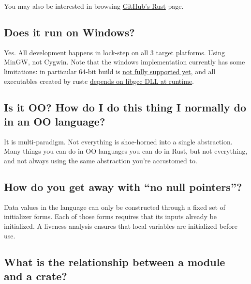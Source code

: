 \documentclass[]{article}
\begin{document}
You may also be interested in browsing
\href{https://github.com/trending?l=rust}{GitHub's Rust} page.

\subsection{Does it run on Windows?}\label{does-it-run-on-windows}

Yes. All development happens in lock-step on all 3 target platforms.
Using MinGW, not Cygwin. Note that the windows implementation currently
has some limitations: in particular 64-bit build is
\href{https://github.com/rust-lang/rust/issues/1237}{not fully supported
yet}, and all executables created by rustc
\href{https://github.com/rust-lang/rust/issues/11782}{depends on libgcc
DLL at runtime}.

\subsection{Is it OO? How do I do this thing I normally do in an OO
language?}\label{is-it-oo-how-do-i-do-this-thing-i-normally-do-in-an-oo-language}

It is multi-paradigm. Not everything is shoe-horned into a single
abstraction. Many things you can do in OO languages you can do in Rust,
but not everything, and not always using the same abstraction you're
accustomed to.

\subsection{How do you get away with ``no null
pointers''?}\label{how-do-you-get-away-with-no-null-pointers}

Data values in the language can only be constructed through a fixed set
of initializer forms. Each of those forms requires that its inputs
already be initialized. A liveness analysis ensures that local variables
are initialized before use.

\subsection{What is the relationship between a module and a
crate?}\label{what-is-the-relationship-between-a-module-and-a-crate}
\end{document}
